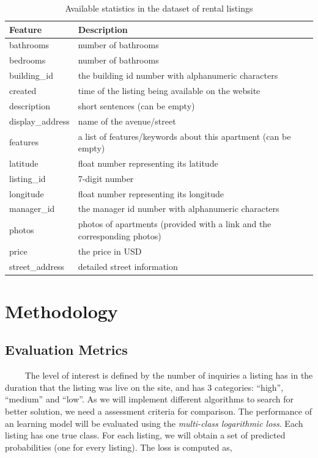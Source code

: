 \documentclass{article}
\begin{document}
\begin{table}[!htbp]
\centering
\label{datatable}
\begin{tabular}{ll}
\hline
Feature & Description \\
\hline
bathrooms & number of bathrooms \\
bedrooms & number of bathrooms \\
building\_id & the building id number with alphanumeric characters \\
created & time of the listing being available on the website \\
description & short sentences (can be empty)\\
display\_address & name of the avenue/street\\
features & a list of features/keywords about this apartment (can be empty)\\
latitude & float number representing its latitude\\
listing\_id & 7-digit number\\
longitude & float number representing its longitude\\
manager\_id & the manager id number with alphanumeric characters \\
photos & photos of apartments (provided with a link and the corresponding photos) \\
price & the price in USD \\
street\_address & detailed street information \\
\hline
\end{tabular}
\caption{Available statistics in the dataset of rental listings}\vspace{0.5em}
\end{table}

\section{Methodology} \label{method}

\subsection{Evaluation Metrics} \label{objective}

~~~~ The level of interest is defined by the number of inquiries a listing has in the duration that the listing was live on the site, and has 3 categories: ``high'', ``medium'' and ``low''. As we will implement different algorithms to search for better solution, we need a assessment criteria for comparison. The performance of an learning model will be evaluated using the \textit{multi-class logarithmic loss}. Each listing has one true class. For each listing, we will obtain a set of predicted probabilities (one for every listing). The loss is computed as,
\end{document}
